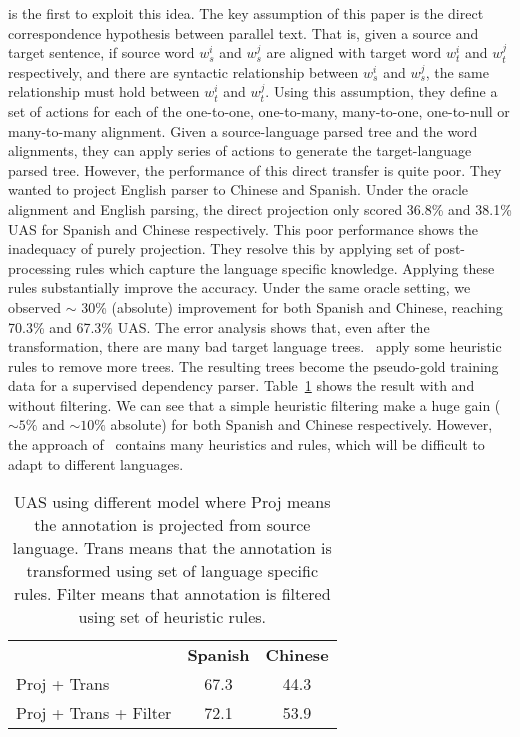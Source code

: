 \textbf{} is the first to exploit this idea. The key assumption of this paper is the direct correspondence hypothesis between parallel text. That is, given a source and target sentence, if source word $w^i_s$ and $w^j_s$ are aligned with target word $w^i_t$ and $w^j_t$ respectively, and there are syntactic relationship between $w^i_s$ and $w^j_s$, the same relationship must hold between $w^i_t$ and $w^j_t$. Using this assumption, they define a set of actions for each of the one-to-one, one-to-many, many-to-one, one-to-null or many-to-many alignment. Given a source-language parsed tree and the word alignments, they can apply series of actions to generate the target-language parsed tree. However, the performance of this direct transfer is quite poor. They wanted to project English parser to Chinese and Spanish. Under the oracle alignment and English parsing, the direct projection only scored 36.8\% and 38.1\% UAS for Spanish and Chinese respectively. This poor performance shows the inadequacy of purely projection. They resolve this by applying set of post-processing rules which capture the language specific knowledge. Applying these rules substantially improve the accuracy. Under the same oracle setting, we observed $\sim$ 30\% (absolute) improvement for both Spanish and Chinese, reaching 70.3\% and 67.3\% UAS. The error analysis shows that, even after the transformation, there are many bad target language trees.~ apply some heuristic rules to remove more trees. The resulting trees become the pseudo-gold training data for a supervised dependency parser. Table~\ref{tab:hwa05:result} shows the result with and without filtering. We can see that a simple heuristic filtering make a huge gain ($\sim 5\%$ and $\sim10\% $ absolute) for both Spanish and Chinese respectively. However, the approach of~ contains many heuristics and rules, which will be difficult to adapt to different languages. 
\begin{table}
\centering
\begin{tabular}{lcc}
                      & \textbf{Spanish} & \textbf{Chinese} \\
Proj + Trans          & 67.3    & 44.3    \\
Proj + Trans + Filter & 72.1    & 53.9   
\end{tabular}
\caption{UAS using different model where Proj means the annotation is projected from source language. Trans means that the annotation is transformed using set of language specific rules. Filter means that annotation is filtered using set of heuristic rules.}
\label{tab:hwa05:result}
\end{table}





